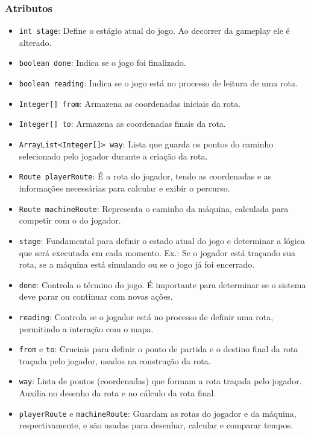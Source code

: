 \documentclass[
	12pt,				%
	oneside,			%
	a4paper,			%
	english,			%
	brazil,				%
	]{abntex2}
\begin{document}
{\subsubsection{Atributos}

\begin{itemize}
    \item \texttt{int stage}: Define o estágio atual do jogo. Ao decorrer da gameplay ele é alterado.
    \item \texttt{boolean done}: Indica se o jogo foi finalizado.
    \item \texttt{boolean reading}: Indica se o jogo está no processo de leitura de uma rota.
    \item \texttt{Integer[] from}: Armazena as coordenadas iniciais da rota.
    \item \texttt{Integer[] to}: Armazena as coordenadas finais da rota.
    \item \texttt{ArrayList<Integer[]> way}: Lista que guarda os pontos do caminho selecionado pelo jogador durante a criação da rota.
    \item \texttt{Route playerRoute}: É a rota do jogador, tendo as coordenadas e as informações necessárias para calcular e exibir o percurso.
    \item \texttt{Route machineRoute}: Representa o caminho da máquina, calculada para competir com o do jogador.
\end{itemize}

\begin{itemize}
    \item \texttt{stage}: Fundamental para definir o estado atual do jogo e determinar a lógica que será executada em cada momento. Ex.: Se o jogador está traçando sua rota, se a máquina está simulando ou se o jogo já foi encerrado.
    \item \texttt{done}: Controla o término do jogo. É importante para determinar se o sistema deve parar ou continuar com novas ações.
    \item \texttt{reading}: Controla se o jogador está no processo de definir uma rota, permitindo a interação com o mapa.
    \item \texttt{from} e \texttt{to}: Cruciais para definir o ponto de partida e o destino final da rota traçada pelo jogador, usados na construção da rota.
    \item \texttt{way}: Lista de pontos (coordenadas) que formam a rota traçada pelo jogador. Auxilia no desenho da rota e no cálculo da rota final.
    \item \texttt{playerRoute} e \texttt{machineRoute}: Guardam as rotas do jogador e da máquina, respectivamente, e são usadas para desenhar, calcular e comparar tempos.
\end{itemize}

}
\end{document}

